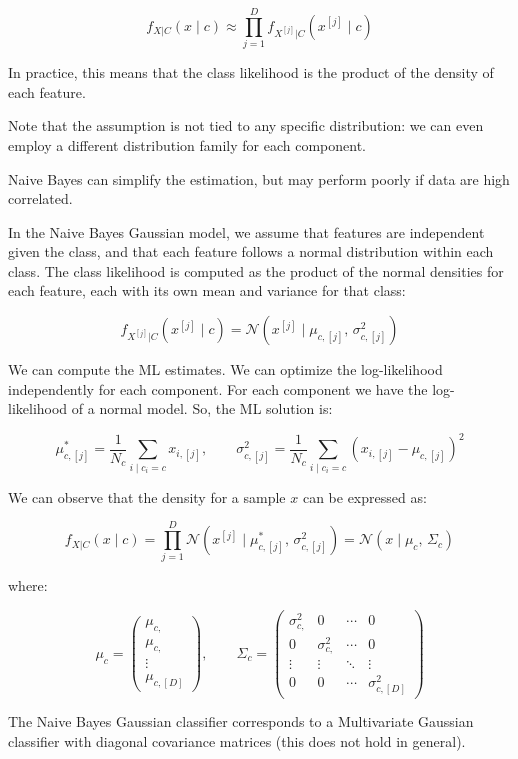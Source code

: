 $$f_{X|C}(x \mid c) \approx \prod_{j=1}^{D} f_{X^{[j]}|C}(x^{[j]} \mid c)$$

In practice, this means that the class likelihood is the product of the density of each feature.

Note that the assumption is not tied to any specific distribution: we can even employ a different distribution family for each component.

Naive Bayes can simplify the estimation, but may perform poorly if data are high correlated.

In the Naive Bayes Gaussian model, we assume that features are independent given the class, and that each feature follows a normal distribution within each class. The class likelihood is computed as the product of the normal densities for each feature, each with its own mean and variance for that class:

$$f_{X^{[j]}|C}(x^{[j]} \mid c) = \mathcal{N}(x^{[j]} \mid \mu_{c,[j]},\, \sigma^2_{c,[j]})$$

We can compute the ML estimates. We can optimize the log-likelihood independently for each component. For each component we have the log-likelihood of a normal model. So, the ML solution is:

$$\mu_{c,[j]}^* = \frac{1}{N_c}\sum_{i \mid c_i = c} x_{i,[j]}, \qquad \sigma^2_{c,[j]} = \frac{1}{N_c}\sum_{i \mid c_i = c}(x_{i,[j]} - \mu_{c,[j]})^2$$

We can observe that the density for a sample $x$ can be expressed as:

$$f_{X|C}(x \mid c) = \prod_{j=1}^{D} \mathcal{N}(x^{[j]} \mid \mu_{c,[j]}^*,\, \sigma^2_{c,[j]}) = \mathcal{N}(x \mid \mu_c,\, \Sigma_c)$$

where:

$$\mu_c = \begin{pmatrix}\mu_{c,} \\ \mu_{c,} \\ \vdots \\ \mu_{c,[D]}\end{pmatrix}, \qquad \Sigma_c = \begin{pmatrix}\sigma^2_{c,} & 0 & \cdots & 0 \\ 0 & \sigma^2_{c,} & \cdots & 0 \\ \vdots & \vdots & \ddots & \vdots \\ 0 & 0 & \cdots & \sigma^2_{c,[D]}\end{pmatrix}$$

The Naive Bayes Gaussian classifier corresponds to a Multivariate Gaussian classifier with diagonal covariance matrices (this does not hold in general).

